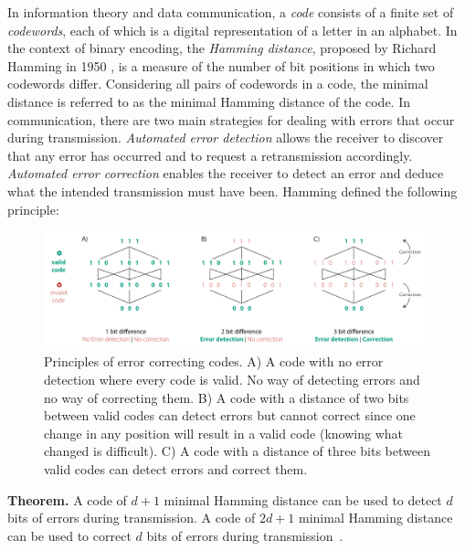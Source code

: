 In information theory and data communication, a \emph{code} consists of a finite set of \emph{codewords}, each of which is a digital representation of a letter in an alphabet.
In the context of binary encoding, the \emph{Hamming distance}, proposed by Richard Hamming in 1950 \cite{Hamming:1950:Bell}, is a measure of the number of bit positions in which two codewords differ.
Considering all pairs of codewords in a code, the minimal distance is referred to as the minimal Hamming distance of the code.
In communication, there are two main strategies for dealing with errors that occur during transmission.
\emph{Automated error detection} allows the receiver to discover that any error has occurred and to request a retransmission accordingly.
\emph{Automated error correction} enables the receiver to detect an error and deduce what the intended transmission must have been.
Hamming defined the following principle:

\begin{figure}[h!]
\begin{center}
\includegraphics[width=\textwidth]{images/filesystem/latest/Hamming1}
\end{center}
\caption{Principles of error correcting codes.
A) A code with no error detection where every code is valid. No way of detecting errors and no way of correcting them.
B) A code with a distance of two bits between valid codes can detect errors but cannot correct since one change in any position will result in a valid code (knowing what changed is difficult).
C) A code with a distance of three bits between valid codes can detect errors and correct them.}
\label{fig:hamming}
\end{figure}

\noindent \textbf{Theorem.} A code of $d+1$ minimal Hamming distance can be used to detect $d$ bits of errors during transmission. A code of $2d+1$ minimal Hamming distance can be used to correct $d$ bits of errors during transmission~\cite{Hamming:1950:Bell}.

